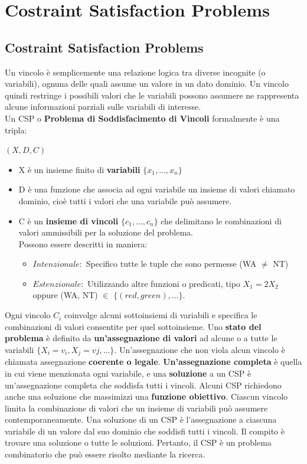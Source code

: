 \chapter{Costraint Satisfaction Problems} \label{ch:Costraint Satisfaction Problems}
\section{Costraint Satisfaction Problems}
Un vincolo è semplicemente una relazione logica tra diverse incognite (o variabili), ognuna delle quali assume un valore in un dato dominio. Un vincolo quindi restringe i possibili valori che le variabili possono assumere ne rappresenta alcune informazioni parziali sulle variabili di interesse. 
\vspace{0.5cm}
\\Un CSP o \textbf{Problema di Soddisfacimento di Vincoli} formalmente è una tripla:
\begin{center}
    $(X, D, C)$
\end{center}
\begin{itemize}
    \item X è un insieme finito di \textbf{variabili} $\{x_1, ..., x_n\}$
    \item D è una funzione che associa ad ogni variabile un insieme di valori chiamato dominio, cioè tutti i valori che una variabile può assumere.
    \item C è un \textbf{insieme di vincoli}  $\{c_1, ..., c_n\}$ che delimitano le combinazioni di valori ammissibili per la soluzione del problema. 
    \\Possono essere descritti in maniera:
    \begin{itemize}
        \item $Intenzionale:$ Specifico tutte le tuple che sono permesse (WA $\neq$ NT)
        \item $Estenzionale:$ Utilizzando altre funzioni o predicati, tipo $X_1 = 2X_2$ oppure (WA, NT) $\in$ $\{(red, green), ...\}$.
    \end{itemize}
\end{itemize}
\newpage
Ogni vincolo $C_i$ coinvolge alcuni sottoinsiemi di variabili e specifica le combinazioni di valori consentite per quel sottoinsieme. Uno \textbf{stato del problema} è definito da \textbf{un’assegnazione di valori} ad alcune o a tutte le variabili $\{X_i=v_i, X_j=vj, ... \}$. Un’assegnazione che non viola alcun vincolo è chiamata assegnazione \textbf{coerente o legale}. \textbf{Un’assegnazione completa} è quella in cui viene menzionata ogni variabile, e una \textbf{soluzione} a un CSP è un’assegnazione completa che soddisfa tutti i vincoli. Alcuni CSP richiedono anche una soluzione che massimizzi una \textbf{funzione obiettivo}. Ciascun vincolo limita la combinazione di valori che un insieme di variabili può assumere contemporaneamente. Una soluzione di un CSP è l’assegnazione a ciascuna variabile di un valore dal suo dominio che soddisfi tutti i vincoli. Il compito è trovare una soluzione o tutte le soluzioni. Pertanto, il CSP è un problema combinatorio che può essere risolto mediante la ricerca.
